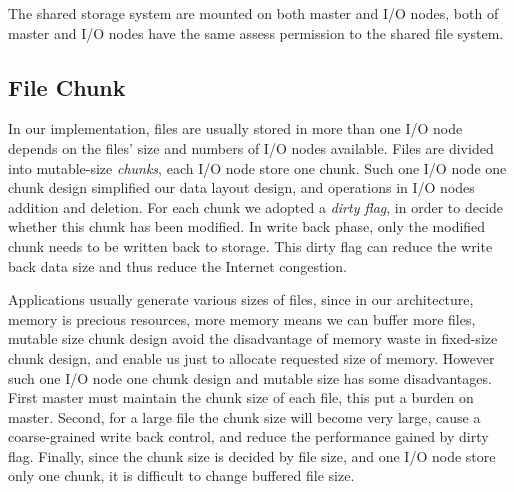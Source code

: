 The shared storage system are mounted on both master and I/O nodes, both of master and I/O nodes
have the same assess permission to the shared file system.

\subsection{File Chunk}
In our implementation, files are usually stored in more than one I/O node depends on the files'
size and numbers of I/O nodes available.
 Files are divided into mutable-size \emph{chunks}, each
I/O node store one chunk.
Such one I/O node one chunk design simplified our data layout design, and operations in I/O nodes addition and deletion.
  For each chunk
we adopted a \emph{dirty flag}, in order to decide whether this chunk has been modified.
In write back phase, only the modified chunk needs to be written back to storage.
This dirty flag can reduce the write back data size and thus reduce the Internet congestion.

Applications usually generate various sizes of files, since in our architecture, memory is precious
resources, more memory means we can buffer more files, mutable size chunk design avoid the
disadvantage of memory waste in fixed-size chunk design, and enable us just to allocate requested size of memory.
However such one I/O node one chunk design and mutable size has some disadvantages.
First master must maintain the chunk size of each file, this put a burden on master.
Second, for a large file the chunk size will become very large, cause a coarse-grained write back
control, and reduce the performance gained by dirty flag.
 Finally, since the chunk size is decided by
file size, and one I/O node store only one chunk, it is difficult to change buffered file size.

